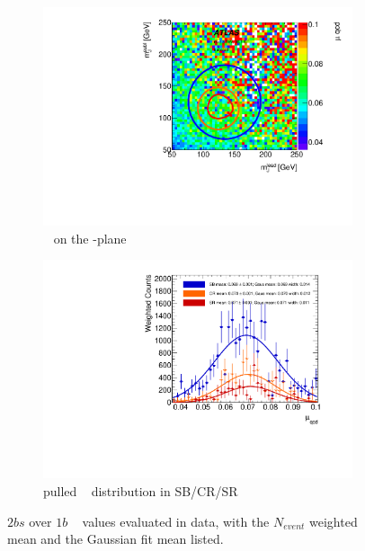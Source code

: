 \begin{figure}[htbp!]
\centering
\captionsetup{justification=centering}
	\hspace{-1cm}
    \begin{subfigure}[b]{0.4\textwidth}
        \includegraphics[width=\textwidth,angle=-90]{figures/boosted/AppendixMuqcdstudy/TwoTag_split_Incl_mH0H1.pdf}
        \caption{\muqcd~ on the \mleadJ-\msublJ plane}
        \label{fig:app-muqcd-2bs-2d}
    \end{subfigure}
    \quad \quad \quad \quad 
    \begin{subfigure}[b]{0.4\textwidth}
        \includegraphics[width=\textwidth,angle=-90]{figures/boosted/AppendixMuqcdstudy/TwoTag_split_Incl_mH0H1_pull.pdf}
        \caption{pulled \muqcd~ distribution in SB/CR/SR}
        \label{fig:app-muqcd-2bs-pull}
    \end{subfigure}
\caption{$2bs$ over $1b$ \muqcd~ values evaluated in data, with the $N_{event}$ weighted mean and the Gaussian fit mean listed.}
\label{fig:app-muqcd-2bs}
\end{figure}

